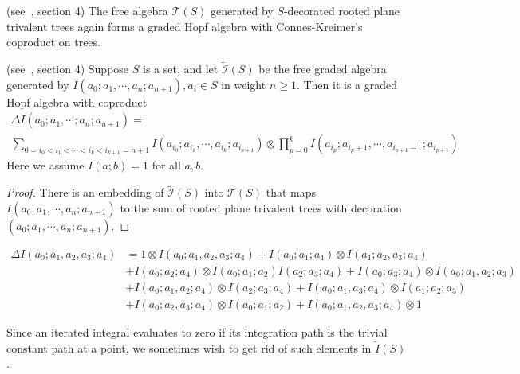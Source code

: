 \begin{theorem}\label{thm: Connes-Kreimer coproduct}(see~\cite{Goncharov_GaloisSymmetriesOfFundamentalGroupoidsAndNoncommutativeGeometry}, section 4)
The free algebra $\mathcal T(S)$ generated by $S$-decorated rooted plane trivalent trees again forms a graded Hopf algebra with Connes-Kreimer's coproduct on trees.
\end{theorem}

\begin{theorem}\label{thm: embedding of I(S) -> T(S)}(see~\cite{Goncharov_GaloisSymmetriesOfFundamentalGroupoidsAndNoncommutativeGeometry}, section 4)
Suppose $S$ is a set, and let $\widetilde{\mathcal I}(S)$ be the free graded algebra generated by $I(a_0;a_1,\cdots,a_n;a_{n+1}),a_i\in S$ in weight $n\geq1$. Then it is a graded Hopf algebra with coproduct
\begin{multline}\label{eq: Coproduct for iterated integrals}
\Delta I(a_0;a_1,\cdots;a_n;a_{n+1})=\\
\sum_{0=i_0<i_1<\cdots<i_k<i_{k+1}=n+1}I(a_{i_0};a_{i_1},\cdots,a_{i_k};a_{i_{k+1}})\otimes\prod_{p=0}^kI(a_{i_p};a_{i_p+1},\cdots,a_{i_{p+1}-1};a_{i_{p+1}})
\end{multline}
Here we assume $I(a;b)=1$ for all $a,b$.
\end{theorem}

\begin{proof}
There is an embedding of $\widetilde{\mathcal I}(S)$ into $\mathcal T(S)$ that maps $I(a_0;a_1,\cdots,a_n;a_{n+1})$ to the sum of rooted plane trivalent trees with decoration $(a_0;a_1,\cdots,a_n;a_{n+1})$.
\end{proof}

\begin{example}
\begin{align*}
\Delta I(a_0;a_1,a_2,a_3;a_4)&=1\otimes I(a_0;a_1,a_2,a_3;a_4)+I(a_0;a_1;a_4)\otimes I(a_1;a_2,a_3;a_4)\\
&+I(a_0;a_2;a_4)\otimes I(a_0;a_1;a_2)I(a_2;a_3;a_4)+I(a_0;a_3;a_4)\otimes I(a_0;a_1,a_2;a_3)\\
&+I(a_0;a_1,a_2;a_4)\otimes I(a_2;a_3;a_4)+I(a_0;a_1,a_3;a_4)\otimes I(a_1;a_2;a_3)\\
&+I(a_0;a_2,a_3;a_4)\otimes I(a_0;a_1;a_2)+I(a_0;a_1,a_2,a_3;a_4)\otimes1
\end{align*}
\end{example}

Since an iterated integral evaluates to zero if its integration path is the trivial constant path at a point, we sometimes wish to get rid of such elements in $\widetilde I(S)$.

